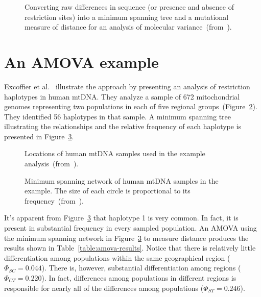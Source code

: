 \documentclass[12pt]{article}
\begin{document}
\begin{figure}
\begin{center}
\end{center}
\caption{Converting raw differences in sequence (or presence and
  absence of restriction sites) into a minimum spanning tree and a
  mutational measure of distance for an analysis of molecular variance~(from~\cite{Excoffier-etal92}).}\label{fig:amova-procedure}
\end{figure}

\section*{An AMOVA example}

Excoffier et al.~\cite{Excoffier-etal92} illustrate the approach by
presenting an analysis of restriction haplotypes in human mtDNA. They
analyze a sample of 672 mitochondrial genomes representing two
populations in each of five regional
groups~(Figure~\ref{fig:amova-sample-locations}). They identified 56
haplotypes in that sample. A minimum spanning tree illustrating the
relationships and the relative frequency of each haplotype is
presented in Figure~\ref{fig:amova-haplotypes}.

\begin{figure}
\begin{center}
\end{center}
\caption{Locations of human mtDNA samples used in the example
  analysis~(from~\cite{Excoffier-etal92}).}\label{fig:amova-sample-locations}
\end{figure}

\begin{figure}
\begin{center}
\end{center}
\caption{Minimum spanning network of human mtDNA samples in the
  example. The size of each circle is proportional to its
  frequency~(from~\cite{Excoffier-etal92}).}\label{fig:amova-haplotypes}
\end{figure}

It's apparent from Figure~\ref{fig:amova-haplotypes} that haplotype 1
is very common. In fact, it is present in substantial frequency in
every sampled population. An AMOVA using the minimum spanning network
in Figure~\ref{fig:amova-haplotypes} to measure distance produces the
results shown in Table~\ref{table:amova-results}. Notice that there is
relatively little differentiation among populations within the same
geographical region ($\Phi_{SC} = 0.044$). There is, however,
substantial differentiation among regions ($\Phi_{CT} = 0.220$). In
fact, differences among populations in different regions is
responsible for nearly all of the differences among populations
($\Phi_{ST} = 0.246$).
\end{document}
